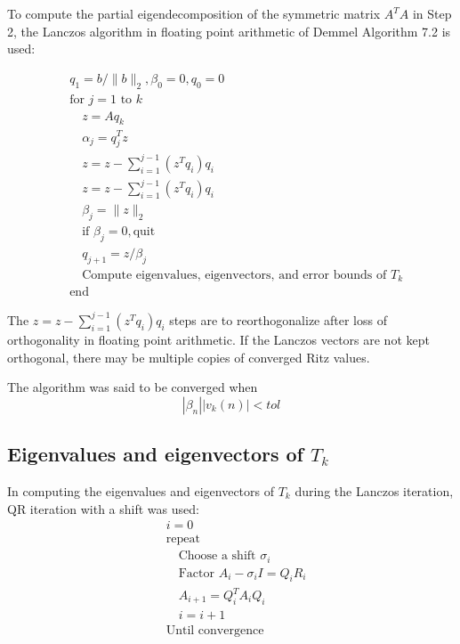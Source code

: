 \documentclass[11pt]{article} %
\begin{document}
To compute the partial eigendecomposition of the symmetric matrix $A^T A$ in Step 2, the Lanczos algorithm in floating point arithmetic of Demmel Algorithm 7.2 is used:

\begin{equation}
\begin{split}
 &q_1 = b / \|b\|_2, \beta_0 = 0, q_0 = 0\\
&\text{for } j = 1 \text{ to } k\\
&\quad z = A q_k\\
& \quad \alpha_j = q_j^T z\\
& \quad z = z-\sum_{i=1}^{j-1} (z^T q_i)q_i \\
& \quad z = z-\sum_{i=1}^{j-1} (z^T q_i)q_i \\
& \quad \beta_j = \|z\|_2\\
& \quad \text{if } \beta_j = 0,  \text{quit}\\
& \quad q_{j+1} = z / \beta_j\\
& \quad \text{Compute eigenvalues, eigenvectors, and error bounds of } T_k\\
& \text{end}
\end{split}
\end{equation}

The $z = z-\sum_{i=1}^{j-1} (z^T q_i)q_i $  steps are to reorthogonalize after loss of orthogonality in floating point arithmetic. If the Lanczos vectors are not kept orthogonal, there may be multiple copies of converged Ritz values.

The algorithm was said to be converged when
\begin{equation}
| \beta_n | | v_k (n) | < tol
\end{equation}

\subsection{Eigenvalues and eigenvectors of $T_k$}

In computing the eigenvalues and eigenvectors of $T_k$ during the Lanczos iteration, QR iteration with a shift was used:
\begin{equation}
\begin{split}
&i = 0\\
&\text{repeat}\\
&\quad \text{Choose a shift }\sigma_i \\
& \quad \text{Factor }A_i - \sigma_i I = Q_i R_i \\
& \quad A_{i+1} = Q_i^T A_i Q_i \\
& \quad i = i+1 \\
&\text{Until convergence}
\end{split}
\end{equation}
\end{document}
